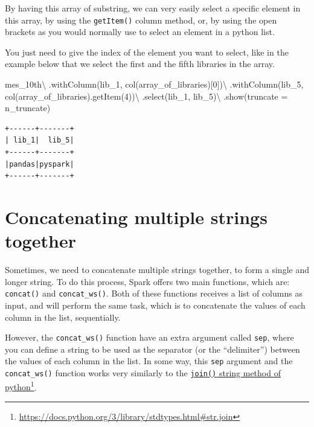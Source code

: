 \documentclass[
  11pt,
  letterpaper,
  DIV=11,
  numbers=noendperiod]{scrreprt}
\newenvironment{Shaded}{\begin{snugshade}}{\end{snugshade}}
\newcommand{\DecValTok}[1]{\textcolor[rgb]{0.68,0.00,0.00}{#1}}
\newcommand{\NormalTok}[1]{\textcolor[rgb]{0.00,0.23,0.31}{#1}}
\newcommand{\OperatorTok}[1]{\textcolor[rgb]{0.37,0.37,0.37}{#1}}
\newcommand{\StringTok}[1]{\textcolor[rgb]{0.13,0.47,0.30}{#1}}
\begin{document}
By having this array of substring, we can very easily select a specific
element in this array, by using the \texttt{getItem()} column method,
or, by using the open brackets as you would normally use to select an
element in a python list.

You just need to give the index of the element you want to select, like
in the example below that we select the first and the fifth libraries in
the array.

\begin{Shaded}
\begin{Highlighting}[]
\NormalTok{mes\_10th}\OperatorTok{\textbackslash{}}
\NormalTok{    .withColumn(}\StringTok{\textquotesingle{}lib\_1\textquotesingle{}}\NormalTok{, col(}\StringTok{\textquotesingle{}array\_of\_libraries\textquotesingle{}}\NormalTok{)[}\DecValTok{0}\NormalTok{])}\OperatorTok{\textbackslash{}}
\NormalTok{    .withColumn(}\StringTok{\textquotesingle{}lib\_5\textquotesingle{}}\NormalTok{, col(}\StringTok{\textquotesingle{}array\_of\_libraries\textquotesingle{}}\NormalTok{).getItem(}\DecValTok{4}\NormalTok{))}\OperatorTok{\textbackslash{}}
\NormalTok{    .select(}\StringTok{\textquotesingle{}lib\_1\textquotesingle{}}\NormalTok{, }\StringTok{\textquotesingle{}lib\_5\textquotesingle{}}\NormalTok{)}\OperatorTok{\textbackslash{}}
\NormalTok{    .show(truncate }\OperatorTok{=}\NormalTok{ n\_truncate)}
\end{Highlighting}
\end{Shaded}

\begin{verbatim}
+------+-------+
| lib_1|  lib_5|
+------+-------+
|pandas|pyspark|
+------+-------+
\end{verbatim}

\section{Concatenating multiple strings
together}\label{concatenating-multiple-strings-together}

Sometimes, we need to concatenate multiple strings together, to form a
single and longer string. To do this process, Spark offers two main
functions, which are: \texttt{concat()} and \texttt{concat\_ws()}. Both
of these functions receives a list of columns as input, and will perform
the same task, which is to concatenate the values of each column in the
list, sequentially.

However, the \texttt{concat\_ws()} function have an extra argument
called \texttt{sep}, where you can define a string to be used as the
separator (or the ``delimiter'') between the values of each column in
the list. In some way, this \texttt{sep} argument and the
\texttt{concat\_ws()} function works very similarly to the
\href{https://docs.python.org/3/library/stdtypes.html\#str.join}{\texttt{join()}
string method of python}\footnote{\url{https://docs.python.org/3/library/stdtypes.html\#str.join}}.
\end{document}
